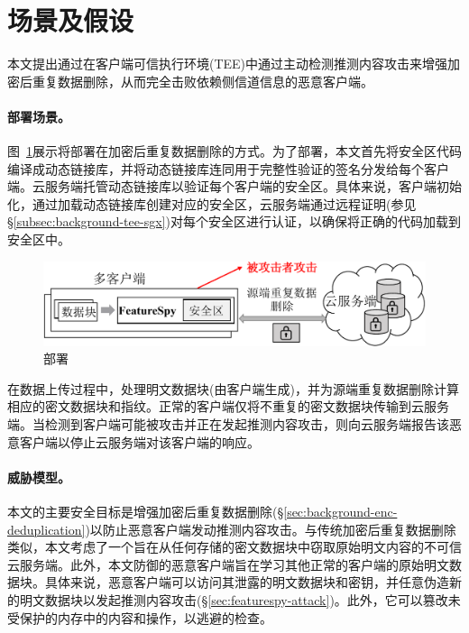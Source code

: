 \section{场景及假设}
\label{sec:featurespy-setting}

本文提出\sysnameF 通过在客户端可信执行环境(TEE)中通过主动检测推测内容攻击来增强加密后重复数据删除，从而完全击败依赖侧信道信息的恶意客户端。

\paragraph*{部署场景。}图~\ref{fig:featurespy-model}展示将\sysnameF 部署在加密后重复数据删除的方式。为了部署\sysnameF，本文首先将安全区代码编译成动态链接库\cite{sgx}，并将动态链接库连同用于完整性验证的签名分发给每个客户端。云服务端托管动态链接库以验证每个客户端的安全区。具体来说，客户端初始化\sysnameF，通过加载动态链接库创建对应的安全区，云服务端通过远程证明\cite{sgx}(参见\S\ref{subsec:background-tee-sgx})对每个安全区进行认证，以确保将正确的代码加载到安全区中。

\begin{figure}[!htb]
    \centering
    \includegraphics[width=\textwidth]{pic/featurespy/deployment.pdf}
    \caption{部署\sysnameF}
    \label{fig:featurespy-model}
\end{figure}

在数据上传过程中，\sysnameF 处理明文数据块(由客户端生成)，并为源端重复数据删除计算相应的密文数据块和指纹。正常的客户端仅将不重复的密文数据块传输到云服务端。当\sysnameF 检测到客户端可能被攻击并正在发起推测内容攻击，则向云服务端报告该恶意客户端以停止云服务端对该客户端的响应。

\paragraph*{威胁模型。}本文的主要安全目标是增强加密后重复数据删除(\S\ref{sec:background-enc-deduplication})以防止恶意客户端发动推测内容攻击。与传统加密后重复数据删除\cite{bellare2013MLE}类似，本文考虑了一个旨在从任何存储的密文数据块中窃取原始明文内容的不可信云服务端。此外，本文防御的恶意客户端旨在学习其他正常的客户端的原始明文数据块。具体来说，恶意客户端可以访问其泄露的明文数据块和密钥，并任意伪造新的明文数据块以发起推测内容攻击(\S\ref{sec:featurespy-attack})。此外，它可以篡改未受保护的内存中的内容和操作，以逃避\sysnameF 的检查。


